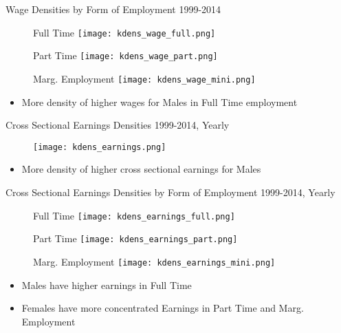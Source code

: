 \documentclass[hyperref={bookmarks=false}]{beamer}
\begin{document}
\begin{appendix}
\begin{frame}{Wage Densities by Form of Employment}
1999-2014
\begin{figure}[!t]
\centering
\begin{minipage}[b]{0.32\textwidth}{Full Time}
\centering
\texttt{[image: kdens\_wage\_full.png]}
\end{minipage}
\begin{minipage}[b]{0.32\textwidth}{Part Time}
\centering
\texttt{[image: kdens\_wage\_part.png]}
\end{minipage}
\begin{minipage}[b]{0.32\textwidth}{Marg. Employment}
\centering
\texttt{[image: kdens\_wage\_mini.png]}
\end{minipage}
\end{figure}
\begin{itemize}
\setlength{\itemsep}{0.7 cm}
\item More density of higher wages for Males in Full Time employment
\end{itemize}
\end{frame}

\begin{frame}{Cross Sectional Earnings Densities}
1999-2014, Yearly
\begin{figure}[!t]
\centering
\begin{minipage}[b]{0.32\textwidth}{}
\centering
\texttt{[image: kdens\_earnings.png]}
\end{minipage}
\end{figure}
\begin{itemize}
\setlength{\itemsep}{0.7 cm}
\item More density of higher cross sectional earnings for Males
\end{itemize}
\end{frame}

\begin{frame}{Cross Sectional Earnings Densities by Form of Employment}
1999-2014, Yearly
\begin{figure}[!t]
\centering
\begin{minipage}[b]{0.32\textwidth}{Full Time}
\centering
\texttt{[image: kdens\_earnings\_full.png]}
\end{minipage}
\begin{minipage}[b]{0.32\textwidth}{Part Time}
\centering
\texttt{[image: kdens\_earnings\_part.png]}
\end{minipage}
\begin{minipage}[b]{0.32\textwidth}{Marg. Employment}
\centering
\texttt{[image: kdens\_earnings\_mini.png]}
\end{minipage}
\end{figure}
\begin{itemize}
\setlength{\itemsep}{0.7 cm}
\item Males have higher earnings in Full Time
\item Females have more concentrated Earnings in Part Time and Marg. Employment
\end{itemize}
\end{frame}



\end{appendix}
\end{document}
